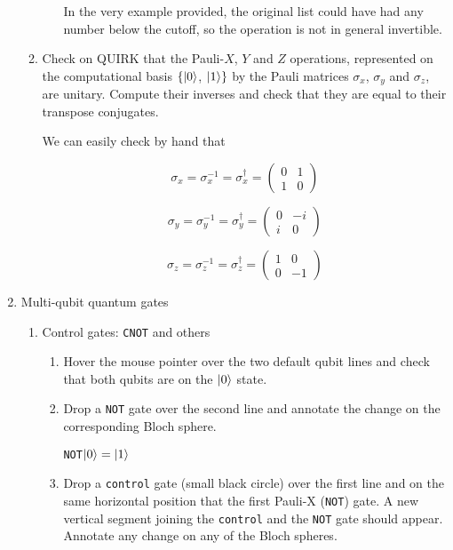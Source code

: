\documentclass[11pt]{article}
\begin{document}
\begin{enumerate}[label*=\arabic*.]
\begin{enumerate}[label*=\arabic*.]
\begin{enumerate}[label=(\alph*)]
            In the very example provided, the original list could have had any number below the cutoff, so the operation is not in general invertible.
        \end{enumerate}
        
        \item Check on QUIRK that the Pauli-$X$, $Y$ and $Z$ operations, represented on the computational basis $\{\ket{0}$, $\ket{1}\}$ by the Pauli matrices $\sigma_x$, $\sigma_y$ and $\sigma_z$, are unitary. Compute their inverses and check that they are equal to their transpose conjugates.

        We can easily check by hand that

        $$
        \sigma_x = \sigma^{-1}_x = \sigma^\dagger_x = 
        \begin{pmatrix}
            0 & 1 \\
            1 & 0
        \end{pmatrix}
        $$

        $$
        \sigma_y = \sigma^{-1}_y = \sigma^\dagger_y = 
        \begin{pmatrix}
            0 & -i \\
            i & 0
        \end{pmatrix}
        $$

        $$
        \sigma_z = \sigma^{-1}_z = \sigma^\dagger_z = 
        \begin{pmatrix}
            1 & 0 \\
            0 & -1
        \end{pmatrix}
        $$
        
    \end{enumerate}
    \item Multi-qubit quantum gates
    \begin{enumerate}[label*=\arabic*.]
    \item Control gates: \texttt{CNOT} and others
    \begin{enumerate}[label=(\alph*)]
    \item Hover the mouse pointer over the two default qubit lines and check that both qubits are on the $\ket{0}$
    state.
    \item Drop a \texttt{NOT} gate over the second line and annotate the change on the corresponding Bloch sphere.

    \texttt{NOT}$\ket{0}=\ket{1}$
    
    \item Drop a \texttt{control} gate (small black circle) over the first line and on the same horizontal position that
    the first Pauli-X (\texttt{NOT}) gate. A new vertical segment joining the \texttt{control} and the \texttt{NOT} gate should
    appear. Annotate any change on any of the Bloch spheres.


\end{enumerate}
\end{enumerate}
\end{enumerate}
\end{document}
